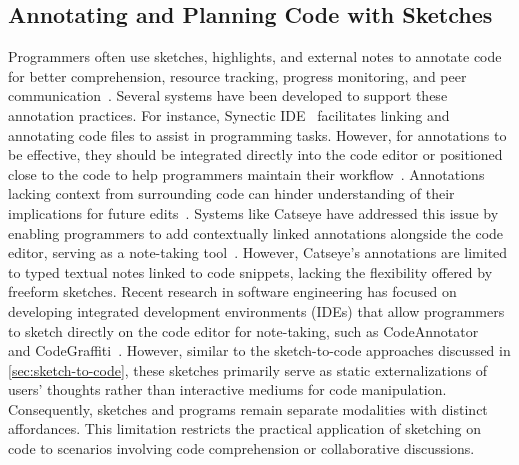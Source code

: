 


\subsection{Annotating and Planning Code with Sketches}
Programmers often use sketches, highlights, and external notes to annotate code for better comprehension, resource tracking, progress monitoring, and peer communication~\cite{maalej_comprehension_2014, sutherland_investigation_2017}. Several systems have been developed to support these annotation practices. For instance, Synectic IDE~\cite{synectic} facilitates linking and annotating code files to assist in programming tasks. However, for annotations to be effective, they should be integrated directly into the code editor or positioned close to the code to help programmers maintain their workflow~\cite{parnin_evaluating_2010}.
Annotations lacking context from surrounding code can hinder understanding of their implications for future edits~\cite{maalej_comprehension_2014}. Systems like Catseye have addressed this issue by enabling programmers to add contextually linked annotations alongside the code editor, serving as a note-taking tool~\cite{horvath_using_2022}.
However, Catseye's annotations are limited to typed textual notes linked to code snippets, lacking the flexibility offered by freeform sketches.
% 
Recent research in software engineering has focused on developing integrated development environments (IDEs) that allow programmers to sketch directly on the code editor for note-taking, such as CodeAnnotator~\cite{10.1145/1324892.1324935} and CodeGraffiti~\cite{10.1145/1866218.1866260}.
However, similar to the sketch-to-code approaches discussed in \autoref{sec:sketch-to-code}, these sketches primarily serve as static externalizations of users' thoughts rather than interactive mediums for code manipulation.
Consequently, sketches and programs remain separate modalities with distinct affordances. This limitation restricts the practical application of sketching on code to scenarios involving code comprehension or collaborative discussions.

